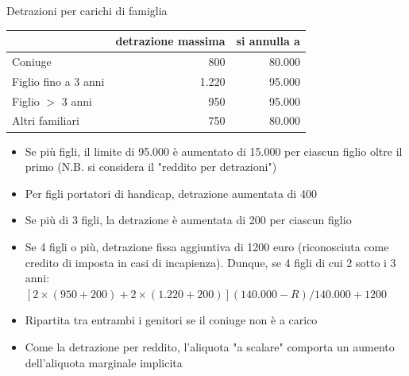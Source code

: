 \documentclass[aspectratio=64,11pt]{beamer}
\newcommand\€{\,\text{€}}
\begin{document}
\begin{frame}{Detrazioni per carichi di famiglia}
\begin{center}
\begin{tabular}{lrr}
 & detrazione massima & si annulla a\\[0pt]
\hline
Coniuge & 800 & 80.000\\[0pt]
Figlio fino a 3 anni & 1.220 & 95.000\\[0pt]
Figlio $>$ 3 anni & 950 & 95.000\\[0pt]
Altri familiari & 750 & 80.000\\[0pt]
\end{tabular}
\end{center}

\begin{itemize}
\item Se più figli, il limite di 95.000 è aumentato di 15.000 per ciascun figlio
oltre il primo (N.B. si considera il "reddito per detrazioni")
\item Per figli portatori di handicap, detrazione aumentata di 400
\item Se più di 3 figli, la detrazione è aumentata di 200 per ciascun figlio
\item Se 4 figli o più, detrazione fissa aggiuntiva di 1200 euro (riconosciuta
come credito di imposta in casi di incapienza). Dunque, se 4 figli di cui 2 sotto i 3 anni:
$[2\times(950+200)+2\times(1.220+200)](140.000-R)/140.000+1200$
\item Ripartita tra entrambi i genitori se il coniuge non è a carico
\item Come la detrazione per reddito, l'aliquota "a scalare" comporta un aumento
dell'aliquota marginale implicita
\end{itemize}
\end{frame}
\end{document}
